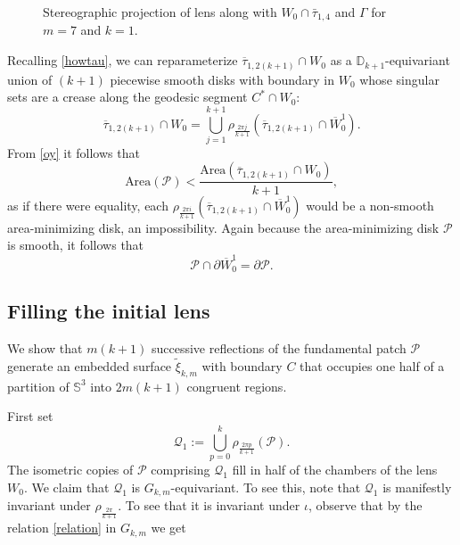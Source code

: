\documentclass[11pt, reqno]{amsart}
\numberwithin{equation}{section}
\begin{document}
  \begin{figure}
	\centering
	\resizebox{4in}{!}{}
	\caption{Stereographic projection of lens along with $W_0\cap\bar{\tau}_{1,4}$ and $\Gamma$ for $m=7$ and $k=1$.}
	\label{Plotm7}
\end{figure}

Recalling \eqref{howtau}, we can reparameterize $\overline{\tau}_{1,2(k+1)}\cap W_0$ as a $\mathbb{D}_{k+1}$-equivariant union of $(k+1)$ piecewise smooth disks with boundary in $W_0$ whose singular sets are a crease along the geodesic segment $C^*\cap W_0$:
\begin{equation}\label{oy}
\overline{\tau}_{1,2(k+1)}\cap W_0= \bigcup_{j=1}^{k+1} \rho_{\frac{2\pi j}{k+1}}(\overline{\tau}_{1,2(k+1)}\cap \overline{W}_0^1).
\end{equation}
From \eqref{oy} it follows that
\begin{equation}\label{areabound}
\mbox{Area}(\mathcal{P})< \frac{\mbox{Area}(\overline{\tau}_{1,2(k+1)}\cap W_0)}{k+1}, 
\end{equation}
as if there were equality, each $\rho_{\frac{2\pi i}{k+1}}(\overline{\tau}_{1,2(k+1)}\cap \overline{W}_0^1)$ would be a non-smooth area-minimizing disk, an impossibility.  Again because the area-minimizing disk $\mathcal{P}$ is smooth, it follows that 
\begin{equation}
\mathcal{P}\cap \partial \overline{W}_0^1=\partial\mathcal{P}.
\end{equation}


\subsection{Filling the initial lens}
We show that $m(k+1)$ successive reflections of the fundamental patch $\mathcal{P}$ generate an embedded surface $\tilde{\xi}_{k,m}$ with boundary $C$ that occupies one half of a partition of $\mathbb{S}^3$ into $2m(k+1)$ congruent regions.

First set
\begin{equation}\label{q1}
\mathcal{Q}_1:=\bigcup_{p=0}^{k}\rho_{\frac{2\pi p}{k+1}}(\mathcal{P}). 
\end{equation}
The isometric copies of $\mathcal{P}$ comprising $\mathcal{Q}_1$ fill in half of the chambers of the lens $W_0$. We claim that $\mathcal{Q}_1$ is $G_{k,m}$-equivariant. To see this, note that $\mathcal{Q}_1$ is manifestly invariant under $\rho_{\frac{2\pi}{k+1}}$.  To see that it is invariant under $\iota$, observe that by the relation \eqref{relation} in $G_{k,m}$ we get 
\end{document}

